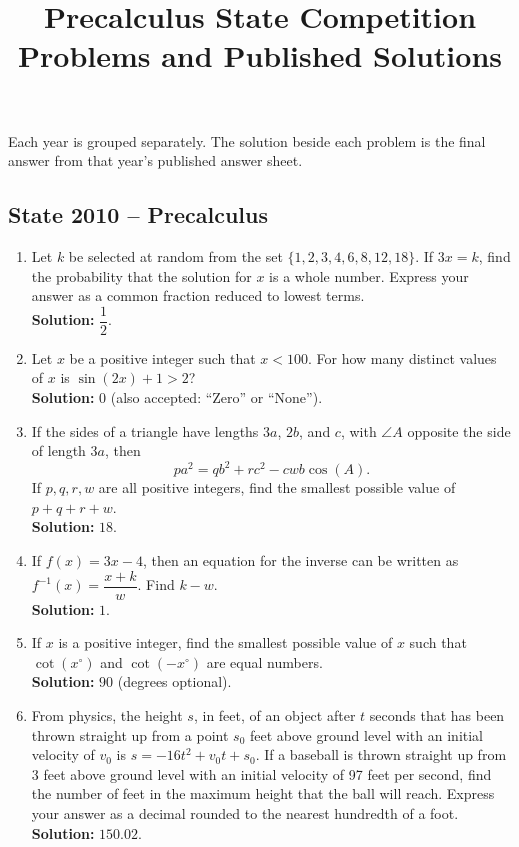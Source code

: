 \documentclass[10pt]{article}
\begin{document}
\title{Precalculus State Competition Problems and Published Solutions}
\date{}
\maketitle
\noindent Each year is grouped separately. The solution beside each problem is the final answer from that year's published answer sheet.
\bigskip

\subsection*{State 2010 -- Precalculus}
\begin{enumerate}
\item Let $k$ be selected at random from the set $\{1,2,3,4,6,8,12,18\}$. If $3x=k$, find the probability that the solution for $x$ is a whole number. Express your answer as a common fraction reduced to lowest terms.\\
\textbf{Solution:} $\dfrac12$.

\item Let $x$ be a positive integer such that $x<100$. For how many distinct values of $x$ is $\sin(2x)+1>2$?\\
\textbf{Solution:} $0$ (also accepted: ``Zero'' or ``None'').

\item If the sides of a triangle have lengths $3a$, $2b$, and $c$, with $\angle A$ opposite the side of length $3a$, then
\[
pa^2=qb^2+rc^2-cwb\cos(A).
\]
If $p,q,r,w$ are all positive integers, find the smallest possible value of $p+q+r+w$.\\
\textbf{Solution:} $18$.

\item If $f(x)=3x-4$, then an equation for the inverse can be written as $f^{-1}(x)=\dfrac{x+k}{w}$. Find $k-w$.\\
\textbf{Solution:} $1$.

\item If $x$ is a positive integer, find the smallest possible value of $x$ such that $\cot(x^\circ)$ and $\cot(-x^\circ)$ are equal numbers.\\
\textbf{Solution:} $90$ (degrees optional).

\item From physics, the height $s$, in feet, of an object after $t$ seconds that has been thrown straight up from a point $s_0$ feet above ground level with an initial velocity of $v_0$ is $s=-16t^2+v_0t+s_0$. If a baseball is thrown straight up from 3 feet above ground level with an initial velocity of 97 feet per second, find the number of feet in the maximum height that the ball will reach. Express your answer as a decimal rounded to the nearest hundredth of a foot.\\
\textbf{Solution:} $150.02$.


\end{enumerate}
\end{document}
